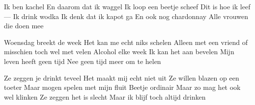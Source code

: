 
\begin{chorus}[2]
Ik ben kachel
En daarom dat ik waggel
Ik loop een beetje scheef
Dit is hoe ik leef
---
Ik drink wodka
Ik denk dat ik kapot ga
En ook nog chardonnay
Alle vrouwen die doen mee
\end{chorus}

\begin{verse*}
Woensdag breekt de week
Het kan me echt niks schelen
Alleen met een vriend of misschien toch wel met velen
Alcohol elke week
Ik kan het aan bevelen
Mijn leven heeft geen tijd
Nee geen tijd meer om te helen
\end{verse*}

\thechorus[2]

\begin{verse*}
Ze zeggen je drinkt teveel
Het maakt mij echt niet uit
Ze willen blazen op een toeter
Maar mogen spelen met mijn fluit
Beetje ordinair
Maar zo mag het ook wel klinken
Ze zeggen het is slecht
Maar ik blijf toch altijd drinken
\end{verse*}

\thechorus[2]